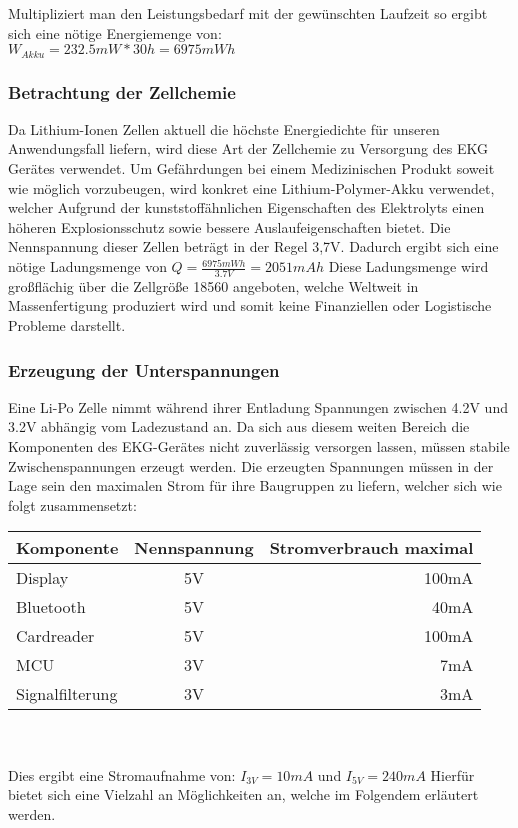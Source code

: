 Multipliziert man den Leistungsbedarf mit der gewünschten Laufzeit so ergibt sich eine nötige Energiemenge von:\\
$W_{Akku} = 232.5mW * 30h = 6975mWh$

\subsubsection{Betrachtung der Zellchemie}


Da Lithium-Ionen Zellen aktuell die höchste Energiedichte für unseren Anwendungsfall liefern, wird diese Art der Zellchemie zu Versorgung des EKG Gerätes verwendet. Um Gefährdungen bei einem Medizinischen Produkt soweit wie möglich vorzubeugen, wird konkret eine Lithium-Polymer-Akku verwendet, welcher Aufgrund der kunststoffähnlichen Eigenschaften des Elektrolyts einen höheren Explosionsschutz sowie bessere Auslaufeigenschaften bietet.
Die Nennspannung dieser Zellen beträgt in der Regel 3,7V. Dadurch ergibt sich eine nötige Ladungsmenge von 
$Q = \frac{6975mWh}{3.7V} = 2051mAh $
Diese Ladungsmenge wird großflächig über die Zellgröße 18560 angeboten, welche Weltweit in Massenfertigung produziert wird und somit keine Finanziellen oder Logistische Probleme darstellt.


\subsubsection{Erzeugung der Unterspannungen}

Eine Li-Po Zelle nimmt während ihrer Entladung Spannungen zwischen 4.2V und 3.2V abhängig vom Ladezustand an. Da sich aus diesem weiten Bereich die Komponenten des EKG-Gerätes nicht zuverlässig versorgen lassen, müssen stabile Zwischenspannungen erzeugt werden. Die erzeugten Spannungen müssen in der Lage sein den maximalen Strom für ihre Baugruppen zu liefern, welcher sich wie folgt zusammensetzt:\\

\begin{tabular}[h]{l|c|r}
Komponente & Nennspannung & Stromverbrauch maximal\\
\hline
Display & 5V & 100mA \\
Bluetooth & 5V & 40mA \\
Cardreader & 5V & 100mA \\
MCU & 3V & 7mA \\
Signalfilterung & 3V & 3mA \\
\end{tabular}
\\
\\
Dies ergibt eine Stromaufnahme von: $I_{3V} = 10mA$ und $I_{5V} = 240mA$
Hierfür bietet sich eine Vielzahl an Möglichkeiten an, welche im Folgendem erläutert werden.\\

